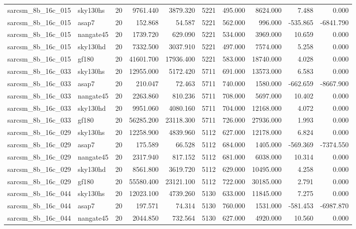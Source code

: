 \documentclass{article}
\begin{document}
\begin{longtable}{llrrrrrrrr}
sarcsm\_8b\_16c\_015 & sky130hs & 20 & 9761.440 & 3879.320 & 5221 & 495.000 & 8624.000 & 7.488 & 0.000 \\
sarcsm\_8b\_16c\_015 & asap7 & 20 & 152.868 & 54.587 & 5221 & 562.000 & 996.000 & -535.865 & -6841.790 \\
sarcsm\_8b\_16c\_015 & nangate45 & 20 & 1739.720 & 629.090 & 5221 & 534.000 & 3969.000 & 10.659 & 0.000 \\
sarcsm\_8b\_16c\_015 & sky130hd & 20 & 7332.500 & 3037.910 & 5221 & 497.000 & 7574.000 & 5.258 & 0.000 \\
sarcsm\_8b\_16c\_015 & gf180 & 20 & 41601.700 & 17936.400 & 5221 & 583.000 & 18740.000 & 4.028 & 0.000 \\
sarcsm\_8b\_16c\_033 & sky130hs & 20 & 12955.000 & 5172.420 & 5711 & 691.000 & 13573.000 & 6.583 & 0.000 \\
sarcsm\_8b\_16c\_033 & asap7 & 20 & 210.047 & 72.463 & 5711 & 740.000 & 1580.000 & -662.659 & -8667.900 \\
sarcsm\_8b\_16c\_033 & nangate45 & 20 & 2263.860 & 810.236 & 5711 & 708.000 & 5697.000 & 10.402 & 0.000 \\
sarcsm\_8b\_16c\_033 & sky130hd & 20 & 9951.060 & 4080.160 & 5711 & 704.000 & 12168.000 & 4.072 & 0.000 \\
sarcsm\_8b\_16c\_033 & gf180 & 20 & 56285.200 & 23118.300 & 5711 & 726.000 & 27936.000 & 1.993 & 0.000 \\
sarcsm\_8b\_16c\_029 & sky130hs & 20 & 12258.900 & 4839.960 & 5112 & 627.000 & 12178.000 & 6.824 & 0.000 \\
sarcsm\_8b\_16c\_029 & asap7 & 20 & 175.589 & 66.528 & 5112 & 684.000 & 1405.000 & -569.369 & -7374.550 \\
sarcsm\_8b\_16c\_029 & nangate45 & 20 & 2317.940 & 817.152 & 5112 & 681.000 & 6038.000 & 10.314 & 0.000 \\
sarcsm\_8b\_16c\_029 & sky130hd & 20 & 8561.800 & 3619.720 & 5112 & 629.000 & 10495.000 & 4.258 & 0.000 \\
sarcsm\_8b\_16c\_029 & gf180 & 20 & 55580.400 & 23121.100 & 5112 & 722.000 & 30185.000 & 2.791 & 0.000 \\
sarcsm\_8b\_16c\_044 & sky130hs & 20 & 12023.100 & 4739.260 & 5130 & 633.000 & 11845.000 & 7.275 & 0.000 \\
sarcsm\_8b\_16c\_044 & asap7 & 20 & 197.571 & 74.314 & 5130 & 760.000 & 1531.000 & -581.453 & -6987.870 \\
sarcsm\_8b\_16c\_044 & nangate45 & 20 & 2044.850 & 732.564 & 5130 & 627.000 & 4920.000 & 10.560 & 0.000 \\

\end{longtable}
\end{document}
